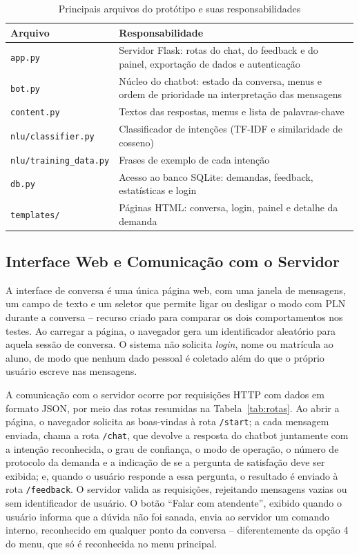 \documentclass[12pt]{article}
\begin{document}
\begin{table}[H]
  \centering
  \begin{tabular}{|p{}|p{}|}
    \hline
    \textbf{Arquivo} & \textbf{Responsabilidade} \\ \hline
    \texttt{app.py} & Servidor Flask: rotas do chat, do feedback e do painel,
    exportação de dados e autenticação \\ \hline
    \texttt{bot.py} & Núcleo do chatbot: estado da conversa, menus e ordem de
    prioridade na interpretação das mensagens \\ \hline
    \texttt{content.py} & Textos das respostas, menus e lista de palavras-chave \\ \hline
    \texttt{nlu/classifier.py} & Classificador de intenções (TF-IDF e
    similaridade de cosseno) \\ \hline
    \texttt{nlu/training\_data.py} & Frases de exemplo de cada intenção \\ \hline
    \texttt{db.py} & Acesso ao banco SQLite: demandas, feedback, estatísticas e
    login \\ \hline
    \texttt{templates/} & Páginas HTML: conversa, login, painel e detalhe da
    demanda \\ \hline
  \end{tabular}
  \caption{Principais arquivos do protótipo e suas responsabilidades}
  \label{tab:modulos}
\end{table}

\subsection{Interface Web e Comunicação com o Servidor}\label{sec:api}

A interface de conversa é uma única página web, com uma janela de mensagens, um
campo de texto e um seletor que permite ligar ou desligar o modo com PLN
durante a conversa -- recurso criado para comparar os dois comportamentos nos
testes. Ao carregar a página, o navegador gera um identificador aleatório para
aquela sessão de conversa. O sistema não solicita \textit{login}, nome ou
matrícula ao aluno, de modo que nenhum dado pessoal é coletado além do que o
próprio usuário escreve nas mensagens.

A comunicação com o servidor ocorre por requisições HTTP com dados em formato
JSON, por meio das rotas resumidas na Tabela~\ref{tab:rotas}. Ao abrir a
página, o navegador solicita as boas-vindas à rota \texttt{/start}; a cada
mensagem enviada, chama a rota \texttt{/chat}, que devolve a resposta do
chatbot juntamente com a intenção reconhecida, o grau de confiança, o modo de
operação, o número de protocolo da demanda e a indicação de se a pergunta de
satisfação deve ser exibida; e, quando o usuário responde a essa pergunta, o
resultado é enviado à rota \texttt{/feedback}. O servidor valida as
requisições, rejeitando mensagens vazias ou sem identificador de usuário. O
botão ``Falar com atendente'', exibido quando o usuário informa que a dúvida não
foi sanada, envia ao servidor um comando interno, reconhecido em qualquer ponto
da conversa -- diferentemente da opção 4 do menu, que só é reconhecida no menu
principal.
\end{document}
